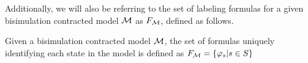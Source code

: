 Additionally, we will also be referring to the set of labeling formulas for a given bisimulation contracted model $\mathcal{M}$ as $F_{\mathcal{M}}$, defined as follows.

\begin{definition}
	\label{def:labelSet}
	Given a bisimulation contracted model $\mathcal{M}$, the set of formulas uniquely identifying each state in the model is defined as $F_{\mathcal{M}} = \{\varphi_s | s \in S\}$
\end{definition}


